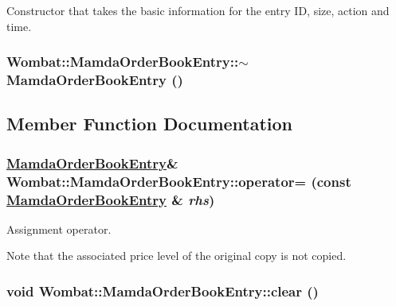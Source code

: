 Constructor that takes the basic information for the entry ID, size, action and time. 

\hypertarget{classWombat_1_1MamdaOrderBookEntry_e6da5c0e8daa8389cbee60184ce76d45}{
\subsubsection[$\sim$MamdaOrderBookEntry]{\setlength{\rightskip}{0pt plus 5cm}Wombat::Mamda\-Order\-Book\-Entry::$\sim$Mamda\-Order\-Book\-Entry ()}}
\label{classWombat_1_1MamdaOrderBookEntry_e6da5c0e8daa8389cbee60184ce76d45}




\subsection{Member Function Documentation}
\hypertarget{classWombat_1_1MamdaOrderBookEntry_b0353343c7f983936ee81934c910222c}{
\subsubsection[operator=]{\setlength{\rightskip}{0pt plus 5cm}\hyperlink{classWombat_1_1MamdaOrderBookEntry}{Mamda\-Order\-Book\-Entry}\& Wombat::Mamda\-Order\-Book\-Entry::operator= (const \hyperlink{classWombat_1_1MamdaOrderBookEntry}{Mamda\-Order\-Book\-Entry} \& {\em rhs})}}
\label{classWombat_1_1MamdaOrderBookEntry_b0353343c7f983936ee81934c910222c}


Assignment operator. 

Note that the associated price level of the original copy is not copied. \hypertarget{classWombat_1_1MamdaOrderBookEntry_6fed9081344e5c08a50cc151b595bf63}{
\subsubsection[clear]{\setlength{\rightskip}{0pt plus 5cm}void Wombat::Mamda\-Order\-Book\-Entry::clear ()}}
\label{classWombat_1_1MamdaOrderBookEntry_6fed9081344e5c08a50cc151b595bf63}


